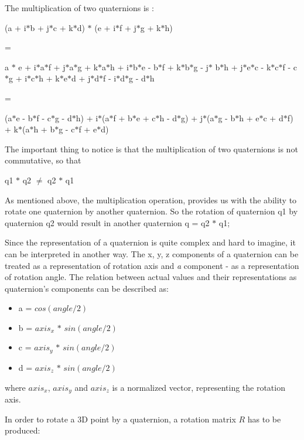 \documentclass[times, 10pt,twocolumn]{article}
\begin{document}
The multiplication of two quaternions is :

\begin{center}
(a + i$\ast$b + j$\ast$c + k$\ast$d) $\ast$ (e + i$\ast$f + j$\ast$g + k$\ast$h)

=

a $\ast$ e + i$\ast$a$\ast$f  + j$\ast$a$\ast$g + k$\ast$a$\ast$h + i$\ast$b$\ast$e - b$\ast$f  + k$\ast$b$\ast$g - j$\ast$ b$\ast$h + j$\ast$e$\ast$c - k$\ast$c$\ast$f - c$\ast$g + i$\ast$c$\ast$h + k$\ast$e$\ast$d + j$\ast$d$\ast$f - i$\ast$d$\ast$g - d$\ast$h

=

(a$\ast$e - b$\ast$f - c$\ast$g - d$\ast$h)  + i$\ast$(a$\ast$f + b$\ast$e + c$\ast$h - d$\ast$g) + j$\ast$(a$\ast$g - b$\ast$h + e$\ast$c + d$\ast$f) + k$\ast$(a$\ast$h + b$\ast$g - c$\ast$f + e$\ast$d)
\end{center}

The important thing to notice is that the multiplication of two quaternions is not commutative, so that
\begin{center}
q1 $\ast$ q2 $\neq$ q2 $\ast$ q1
\end{center}

As mentioned above, the multiplication operation,  provides us with the ability to rotate one quaternion by another quaternion. So the rotation of quaternion q1 by quaternion q2 would result in another quaternion q = q2 $\ast$ q1;

Since the representation of a quaternion is quite complex and hard to imagine, it can be interpreted in another way. The x, y, z components of a quaternion can be treated as a representation of rotation axis and \emph{a} component - as a representation of rotation angle. The relation between actual values and their representations as quaternion's components can be described as:

\begin{itemize}
\item a = $cos(angle / 2)$
\item b =  $axis_x$ $\ast$ $sin(angle / 2)$
\item c = $axis_y$ $\ast$ $sin(angle / 2)$
\item d = $axis_z$ $\ast$ $sin(angle / 2)$
\end{itemize}
where $axis_x$, $axis_y$ and $axis_z$ is a normalized vector, representing the rotation axis.

In order to rotate a 3D point by a quaternion, a rotation matrix $R$ has to be produced:
\end{document}
